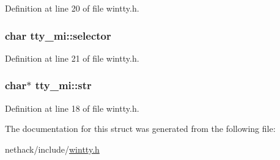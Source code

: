 Definition at line 20 of file wintty.\+h.

\hypertarget{structtty__mi_ade30fd7b68efae0b39e6674408958d1a}{
\subsubsection[{selector}]{\setlength{\rightskip}{0pt plus 5cm}char tty\+\_\+mi\+::selector}}\label{structtty__mi_ade30fd7b68efae0b39e6674408958d1a}


Definition at line 21 of file wintty.\+h.

\hypertarget{structtty__mi_a6c3b20ea2e4c180b6f2ab89fe2d0b72d}{
\subsubsection[{str}]{\setlength{\rightskip}{0pt plus 5cm}char$\ast$ tty\+\_\+mi\+::str}}\label{structtty__mi_a6c3b20ea2e4c180b6f2ab89fe2d0b72d}


Definition at line 18 of file wintty.\+h.



The documentation for this struct was generated from the following file\+:\begin{DoxyCompactItemize}
\item 
nethack/include/\hyperlink{wintty_8h}{wintty.\+h}\end{DoxyCompactItemize}
